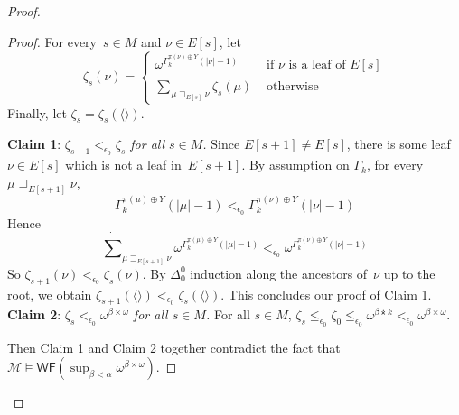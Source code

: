 \documentclass{article}
\numberwithin{theorem}{section}
\newcommand{\WF}{\mathsf{WF}}
\newcommand{\M}{\mathcal{M}}
\newcommand{\ntimes}{\dottimes}
\newcommand{\nsum}{\dot{\sum}}
\begin{document}
\begin{proof}
\begin{proof}
For every~$s \in M$ and $\nu \in E[s]$, let
$$\zeta_s(\nu) = \left\{ \begin{array}{ll}
    \omega^{\Gamma_k^{\pi(\nu) \oplus Y}(|\nu|-1)} & \mbox{ if } \nu \mbox{ is a leaf of } E[s]\\
    \nsum_{\mu \sqsupset_{E[s]} \nu} \zeta_s(\mu) & \mbox{ otherwise }
\end{array}\right.
$$
Finally, let $\zeta_s = \zeta_s(\langle\rangle)$.
\bigskip



\textbf{Claim 1}: \emph{$\zeta_{s+1} <_{\epsilon_0} \zeta_s$ for all $s \in M$.}
Since $E[s+1] \neq E[s]$, there is some leaf~$\nu \in E[s]$ which is not a leaf in~$E[s+1]$.
By assumption on $\Gamma_k$, for every~$\mu \sqsupseteq_{E[s+1]} \nu$,
$$
\Gamma_k^{\pi(\mu) \oplus Y}(|\mu|-1) <_{\epsilon_0} \Gamma_k^{\pi(\nu) \oplus Y}(|\nu|-1)
$$
Hence
$$
\nsum_{\mu \sqsupset_{E[s+1]} \nu} \omega^{\Gamma_k^{\pi(\mu) \oplus Y}(|\mu|-1)} <_{\epsilon_0} \omega^{\Gamma_k^{\pi(\nu) \oplus Y}(|\nu|-1)}
$$
So $\zeta_{s+1}(\nu) <_{\epsilon_0} \zeta_s(\nu)$. By $\Delta^0_0$ induction along the ancestors of~$\nu$ up to the root, we obtain $\zeta_{s+1}(\langle\rangle) <_{\epsilon_0} \zeta_s(\langle\rangle)$. This concludes our proof of Claim 1.\\

\textbf{Claim 2}: \emph{$\zeta_s <_{\epsilon_0} \omega^{\beta \times \omega}$ for all $s \in M$.} For all $s \in M$, $\zeta_s \leq_{\epsilon_0} \zeta_0 \leq_{\epsilon_0} \omega^{\beta \ntimes k} <_{\epsilon_0} \omega^{\beta \times \omega}$. 

Then Claim 1 and Claim 2 together contradict the fact that $\M \models \WF(\sup_{\beta < \alpha} \omega^{\beta \times \omega})$.






\end{proof}
\end{proof}
\end{document}
